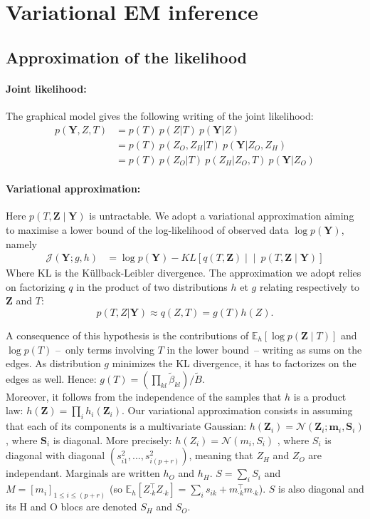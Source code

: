 \documentclass[11pt,a4paper]{article}
\newcommand{\Ybf}{\boldsymbol{Y}}
\newcommand{\Zbf}{\boldsymbol{Z}}
\newcommand{\Sbf}{\boldsymbol{S}}
\newcommand{\mbf}{\boldsymbol{m}}
\newcommand\Ncal{\mathcal{N}}
\newcommand{\Esp}{\mathds{E}}
\begin{document}
\section{Variational EM inference}
\subsection{Approximation of the likelihood}
\paragraph{Joint likelihood:}
The graphical model gives the following writing of the joint likelihood:
\begin{align*}
p(\Ybf,Z,T)& = p(T) \: p(Z|T) \: p(\Ybf|Z) \\
&= p(T)\: p(Z_O,Z_H|T) \: p(\Ybf|Z_O,Z_H) \\
&= p(T) \: p(Z_O|T) \: p(Z_H | Z_O,T)  \: p(\Ybf|Z_O)
\end{align*} 


\paragraph{Variational approximation:}

Here $p(T,\Zbf \mid \Ybf)$ is untractable. We adopt a variational approximation aiming to maximise a lower bound of the log-likelihood of observed data $\log p(\Ybf)$, namely  
\begin{align*}
    \mathcal{J}(\Ybf; g,h)
    & = \log p(\Ybf) - KL\left[q(T,\Zbf) \middle\vert\middle\vert\ p(T,\Zbf \mid \Ybf)\right]
\end{align*}
Where KL is the Küllback-Leibler divergence. The approximation we adopt relies on factorizing $q$ in the product of two distributions $h$ et $g$ relating respectively to $\Zbf$  and $T$: 
$$p(T,Z | \Ybf) \approx  q(Z,T) = g(T)h(Z).$$

 A consequence of this hypothesis is the contributions of   $\Esp_h[\log p(\Zbf\mid T)]$ and $\log p(T)$ --~only terms involving $T$ in the lower bound~-- writing as sums on the edges. As distribution   $g$ minimizes the KL divergence, it has to factorizes on the edges as well. Hence:
$ g(T) = \left(\prod_{kl} \widetilde{\beta}_{kl} \right) / \widetilde{B}$. \\
 
Moreover, it follows from the independence of the samples that $h$ is a product law: $ h(\Zbf) = \prod_i h_i(\Zbf_i)$.
Our variational approximation consists in assuming that each of its components is a multivariate Gaussian: $h(\Zbf_i) = \Ncal(\Zbf_i; \mbf_i, \Sbf_i)$, where $\Sbf_i$ is diagonal. More precisely:  $ h(Z_i) =  \mathcal{N}(m_i,S_i)$ , where $S_i$ is diagonal with diagonal $(s_{i1}^2, ... , s_{i(p+r)}^2)$, meaning that $Z_H$ and $Z_O$ are independant. Marginals are written $h_O$  and  $h_H$. $S=\sum_i S_i$  and $ M =  [m_i]_{1 \leq i \leq (p+r)}$ (so $\Esp_h[Z_{\cdot k}^\intercal Z_{\cdot k}] = \sum_i s_{ik} + m_{\cdot k}^\intercal m_{\cdot k}$). $S$ is also diagonal and its H and O blocs are denoted $S_H$ and $S_O$. 
\end{document}

